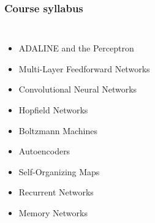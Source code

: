 \begin{frame}[t]
  \frametitle{Course syllabus}%
  \begin{columns}%
    \begin{itemize}%
    \item<1-> \alert<1>{ADALINE and the Perceptron}%
    \item<2-> \alert<2>{Multi-Layer Feedforward Networks}%
    \item<3-> \alert<3>{Convolutional Neural Networks}%
    \item<4-> \alert<4>{Hopfield Networks}%
    \item<5-> \alert<5>{Boltzmann Machines}%
    \item<6-> \alert<6>{Autoencoders}%
    \item<7-> \alert<7>{Self-Organizing Maps}%
    \item<8-> \alert<8>{Recurrent Networks}%
    \item<9-> \alert<9>{Memory Networks}%
    \end{itemize}%
\end{columns}
\end{frame}
